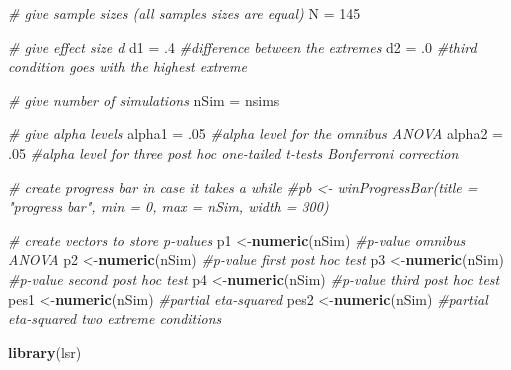 \documentclass[]{article}
\newenvironment{Shaded}{\begin{snugshade}}{\end{snugshade}}
\newcommand{\KeywordTok}[1]{\textcolor[rgb]{0.13,0.29,0.53}{\textbf{#1}}}
\newcommand{\DecValTok}[1]{\textcolor[rgb]{0.00,0.00,0.81}{#1}}
\newcommand{\FloatTok}[1]{\textcolor[rgb]{0.00,0.00,0.81}{#1}}
\newcommand{\StringTok}[1]{\textcolor[rgb]{0.31,0.60,0.02}{#1}}
\newcommand{\CommentTok}[1]{\textcolor[rgb]{0.56,0.35,0.01}{\textit{#1}}}
\newcommand{\NormalTok}[1]{#1}
\begin{document}
\begin{Shaded}
\begin{Highlighting}[]
\CommentTok{# give sample sizes (all samples sizes are equal)}
\NormalTok{N =}\StringTok{ }\DecValTok{145}

\CommentTok{# give effect size d}
\NormalTok{d1 =}\StringTok{ }\FloatTok{.4} \CommentTok{#difference between the extremes}
\NormalTok{d2 =}\StringTok{ }\FloatTok{.0} \CommentTok{#third condition goes with the highest extreme}

\CommentTok{# give number of simulations}
\NormalTok{nSim =}\StringTok{ }\NormalTok{nsims}

\CommentTok{# give alpha levels}
\NormalTok{alpha1 =}\StringTok{ }\FloatTok{.05} \CommentTok{#alpha level for the omnibus ANOVA}
\NormalTok{alpha2 =}\StringTok{ }\FloatTok{.05} \CommentTok{#alpha level for three post hoc one-tailed t-tests Bonferroni correction}

\CommentTok{# create progress bar in case it takes a while}
\CommentTok{#pb <- winProgressBar(title = "progress bar", min = 0, max = nSim, width = 300)}

\CommentTok{# create vectors to store p-values}
\NormalTok{p1 <-}\KeywordTok{numeric}\NormalTok{(nSim) }\CommentTok{#p-value omnibus ANOVA}
\NormalTok{p2 <-}\KeywordTok{numeric}\NormalTok{(nSim) }\CommentTok{#p-value first post hoc test}
\NormalTok{p3 <-}\KeywordTok{numeric}\NormalTok{(nSim) }\CommentTok{#p-value second post hoc test}
\NormalTok{p4 <-}\KeywordTok{numeric}\NormalTok{(nSim) }\CommentTok{#p-value third post hoc test}
\NormalTok{pes1 <-}\KeywordTok{numeric}\NormalTok{(nSim) }\CommentTok{#partial eta-squared}
\NormalTok{pes2 <-}\KeywordTok{numeric}\NormalTok{(nSim) }\CommentTok{#partial eta-squared two extreme conditions}


\KeywordTok{library}\NormalTok{(lsr)}


\end{Highlighting}
\end{Shaded}
\end{document}
